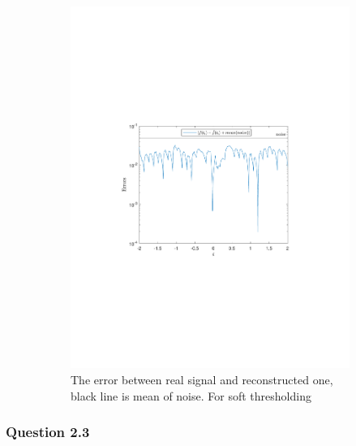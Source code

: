 \documentclass[a4paper]{article}
\begin{document}
\begin{figure}[H]
\begin{subfigure}{0.49\textwidth}
\includegraphics[trim={3.5cm 8cm 4cm 9cm},clip,width=1\textwidth]{Images/Delta=0.1Soft.pdf}
\caption{The error between real signal and reconstructed one, black line is mean of noise. For soft thresholding}
\label{sub:Delta=0.1BetterSoft}
\end{subfigure}
\caption{}
\end{figure}


    \subsubsection{Question 2.3}
\end{document}
